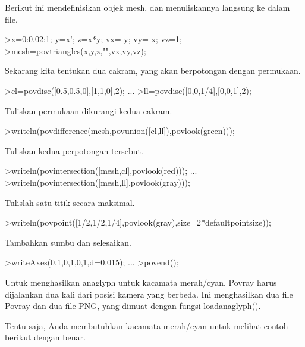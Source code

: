 \documentclass[a4paper,10pt]{article}
\begin{document}
\begin{eulernotebook}
\begin{eulercomment}
Berikut ini mendefinisikan objek mesh, dan menuliskannya langsung ke
dalam file.
\end{eulercomment}
\begin{eulerprompt}
>x=0:0.02:1; y=x'; z=x*y; vx=-y; vy=-x; vz=1;
>mesh=povtriangles(x,y,z,"",vx,vy,vz);
\end{eulerprompt}
\begin{eulercomment}
Sekarang kita tentukan dua cakram, yang akan berpotongan dengan
permukaan.
\end{eulercomment}
\begin{eulerprompt}
>cl=povdisc([0.5,0.5,0],[1,1,0],2); ...
>ll=povdisc([0,0,1/4],[0,0,1],2);
\end{eulerprompt}
\begin{eulercomment}
Tuliskan permukaan dikurangi kedua cakram.
\end{eulercomment}
\begin{eulerprompt}
>writeln(povdifference(mesh,povunion([cl,ll]),povlook(green)));
\end{eulerprompt}
\begin{eulercomment}
Tuliskan kedua perpotongan tersebut.
\end{eulercomment}
\begin{eulerprompt}
>writeln(povintersection([mesh,cl],povlook(red))); ...
>writeln(povintersection([mesh,ll],povlook(gray)));
\end{eulerprompt}
\begin{eulercomment}
Tulislah satu titik secara maksimal.
\end{eulercomment}
\begin{eulerprompt}
>writeln(povpoint([1/2,1/2,1/4],povlook(gray),size=2*defaultpointsize));
\end{eulerprompt}
\begin{eulercomment}
Tambahkan sumbu dan selesaikan.
\end{eulercomment}
\begin{eulerprompt}
>writeAxes(0,1,0,1,0,1,d=0.015); ...
>povend();
\end{eulerprompt}
\begin{eulercomment}
Untuk menghasilkan anaglyph untuk kacamata merah/cyan, Povray harus
dijalankan dua kali dari posisi kamera yang berbeda. Ini menghasilkan
dua file Povray dan dua file PNG, yang dimuat dengan fungsi
loadanaglyph().

Tentu saja, Anda membutuhkan kacamata merah/cyan untuk melihat contoh
berikut dengan benar.


\end{eulercomment}
\end{eulernotebook}
\end{document}
